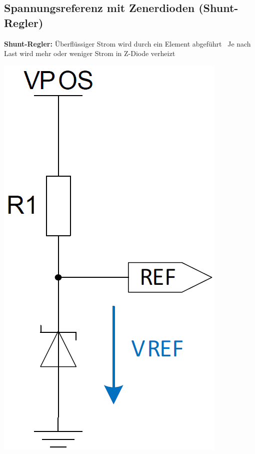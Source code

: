 \subsection{Spannungsreferenz mit Zenerdioden (Shunt-Regler)}

\textbf{Shunt-Regler:} Überflüssiger Strom wird durch ein Element abgeführt 
    \textrightarrow\ Je nach Last wird mehr oder weniger Strom in Z-Diode verheizt

\begin{minipage}[c]{0.15\columnwidth}
    \includegraphics[width=\columnwidth]{images/spannungsreferenz_z-diode.png}
\end{minipage}
